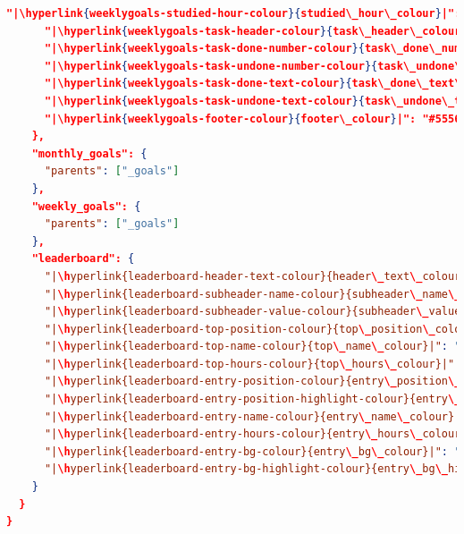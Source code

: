 \documentclass[a4paper, 10pt]{report}
\begin{document}
\begin{lstlisting}[language=json,firstnumber=1]
      "|\hyperlink{weeklygoals-studied-hour-colour}{studied\_hour\_colour}|": "#9A9FCC",
      "|\hyperlink{weeklygoals-task-header-colour}{task\_header\_colour}|": "#9A9FCC",
      "|\hyperlink{weeklygoals-task-done-number-colour}{task\_done\_number\_colour}|": "#7E6FB2",
      "|\hyperlink{weeklygoals-task-undone-number-colour}{task\_undone\_number\_colour}|": "#7E6FB2",
      "|\hyperlink{weeklygoals-task-done-text-colour}{task\_done\_text\_colour}|": "#515151",
      "|\hyperlink{weeklygoals-task-undone-text-colour}{task\_undone\_text\_colour}|": "#F5F6F7",
      "|\hyperlink{weeklygoals-footer-colour}{footer\_colour}|": "#555671"
    },
    "monthly_goals": {
      "parents": ["_goals"]
    },
    "weekly_goals": {
      "parents": ["_goals"]
    },
    "leaderboard": {
      "|\hyperlink{leaderboard-header-text-colour}{header\_text\_colour}|": "#9A9ECE",
      "|\hyperlink{leaderboard-subheader-name-colour}{subheader\_name\_colour}|": "#767372",
      "|\hyperlink{leaderboard-subheader-value-colour}{subheader\_value\_colour}|": "#767372",
      "|\hyperlink{leaderboard-top-position-colour}{top\_position\_colour}|": "#BBBBBB",
      "|\hyperlink{leaderboard-top-name-colour}{top\_name\_colour}|": "#9A9FCC",
      "|\hyperlink{leaderboard-top-hours-colour}{top\_hours\_colour}|": "#BBBBBB",
      "|\hyperlink{leaderboard-entry-position-colour}{entry\_position\_colour}|": "#BBBBBB",
      "|\hyperlink{leaderboard-entry-position-highlight-colour}{entry\_position\_highlight\_colour}|": "#BBBBBB",
      "|\hyperlink{leaderboard-entry-name-colour}{entry\_name\_colour}|": "#9A9FCC",
      "|\hyperlink{leaderboard-entry-hours-colour}{entry\_hours\_colour}|": "#BBBBBB",
      "|\hyperlink{leaderboard-entry-bg-colour}{entry\_bg\_colour}|": "#55568233",
      "|\hyperlink{leaderboard-entry-bg-highlight-colour}{entry\_bg\_highlight\_colour}|": "#55568273"
    }
  }
}
\end{lstlisting}
%
%
\end{document}
